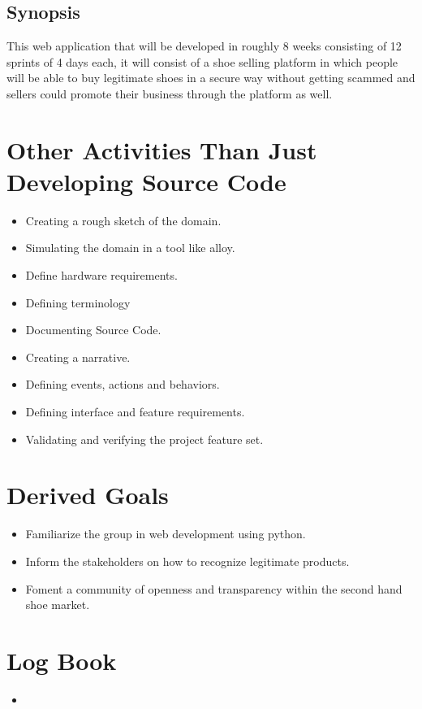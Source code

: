 \subsection{Synopsis}
This web application that will be developed in roughly 8 weeks consisting of 12 sprints of 4 days each, it will consist of a shoe selling platform in which people will be able to buy legitimate shoes in a secure way without getting scammed and sellers could promote their business through the platform as well.
\section{Other Activities Than Just Developing Source Code}
\begin{itemize}
  \item Creating a rough sketch of the domain.
  \item Simulating the domain in a tool like alloy.
  \item Define hardware requirements.
  \item Defining terminology
  \item Documenting Source Code.
  \item Creating a narrative.
  \item Defining events, actions and behaviors.
  \item Defining interface and feature requirements.
  \item Validating and verifying the project feature set.
\end{itemize}
\section{Derived Goals}
\begin{itemize}
  \item Familiarize the group in web development using python.
  \item Inform the stakeholders on how to recognize legitimate products.
  \item Foment a community of openness and transparency within the second hand shoe market.
\end{itemize}
\section{Log Book}
\begin{itemize}
  \item
\end{itemize}
